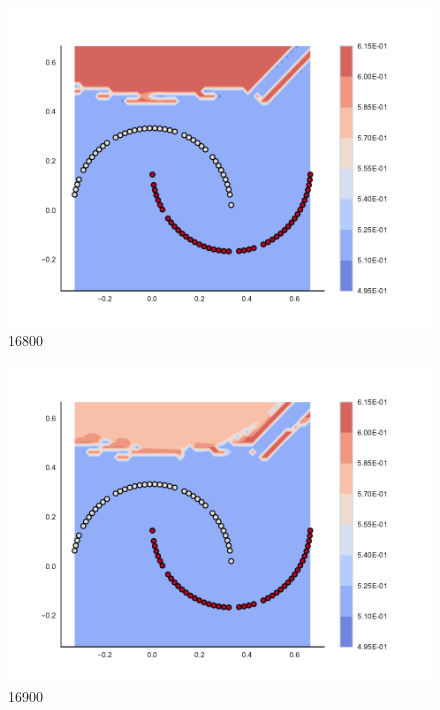 \begin{subfigure}[b]{0.09\textwidth}
    \includegraphics[clip, trim=2.35cm 1.75cm 4.5cm 0cm,width=\textwidth]{img/convergence/16800.pdf}
    \caption{16800}
    \label{fig:convergence_16800}
\end{subfigure}
%
\begin{subfigure}[b]{0.09\textwidth}
    \includegraphics[clip, trim=2.35cm 1.75cm 4.5cm 0cm,width=\textwidth]{img/convergence/16900.pdf}
    \caption{16900}
    \label{fig:convergence_16900}
\end{subfigure}
%
